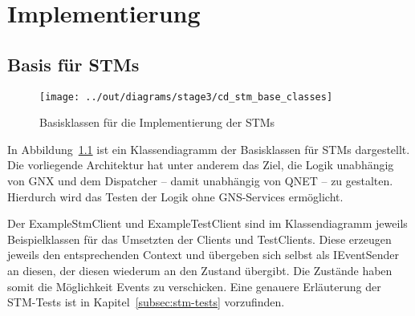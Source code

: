 \chapter{Implementierung}\label{ch:implementierung}


\section{Basis für STMs}\label{sec:basis-fuer-stms}

\begin{figure}[h]
    \centering
    \texttt{[image: ../out/diagrams/stage3/cd\_stm\_base\_classes]}
    \caption{Basisklassen für die Implementierung der STMs}
    \label{fig:cd-stm-base}
\end{figure}

In Abbildung~\ref{fig:cd-stm-base} ist ein Klassendiagramm der Basisklassen für STMs dargestellt.
Die vorliegende Architektur hat unter anderem das Ziel, die Logik unabhängig von GNX und
dem Dispatcher – damit unabhängig von QNET – zu gestalten.
Hierdurch wird das Testen der Logik ohne GNS-Services ermöglicht.

Der ExampleStmClient und ExampleTestClient sind im Klassendiagramm jeweils Beispielklassen für
das Umsetzten der Clients und TestClients.
Diese erzeugen jeweils den entsprechenden Context und übergeben sich selbst als IEventSender an diesen,
der diesen wiederum an den Zustand übergibt.
Die Zustände haben somit die Möglichkeit Events zu verschicken.
Eine genauere Erläuterung der STM-Tests ist in Kapitel~\ref{subsec:stm-tests} vorzufinden.


